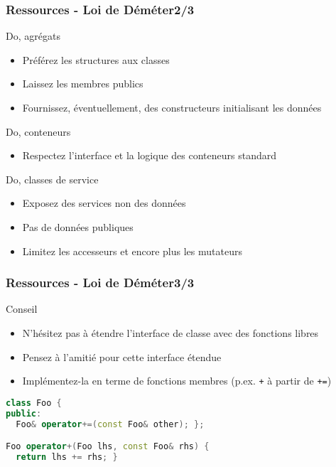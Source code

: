 \documentclass[C++.tex]{subfiles}
\begin{document}
\begin{frame}
	\frametitle{Ressources - Loi de Déméter\titlehfill{}2/3}
	\begin{exampleblock}{Do, agrégats}
		\begin{itemize}
			\item Préférez les structures aux classes
			\item Laissez les membres publics
			\item Fournissez, éventuellement, des constructeurs initialisant les données
		\end{itemize}

	\end{exampleblock}

	\begin{exampleblock}{Do, conteneurs}
		\begin{itemize}
			\item Respectez l'interface et la logique des conteneurs standard
		\end{itemize}

	\end{exampleblock}

	\begin{exampleblock}{Do, classes de service}
		\begin{itemize}
			\item Exposez des services non des données
			\item Pas de données publiques
			\item Limitez les accesseurs et encore plus les mutateurs
		\end{itemize}
	\end{exampleblock}
\end{frame}

\begin{frame}[fragile]
	\frametitle{Ressources - Loi de Déméter\titlehfill{}3/3}
	\begin{block}{Conseil}
		\begin{itemize}
			\item N'hésitez pas à étendre l'interface de classe avec des fonctions libres
			\item Pensez à l'amitié pour cette interface étendue
			\item Implémentez-la en terme de fonctions membres (p.ex. \lstinline|+| à partir de \lstinline|+=|)
		\end{itemize}
	\end{block}

	\begin{lstlisting}[language=C++]
class Foo {
public:
  Foo& operator+=(const Foo& other); };

Foo operator+(Foo lhs, const Foo& rhs) {
  return lhs += rhs; }\end{lstlisting}
\end{frame}
\end{document}
